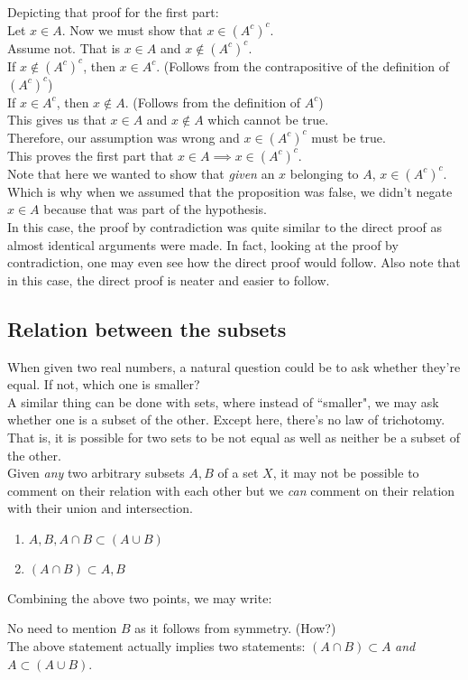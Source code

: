 Depicting that proof for the first part:\\
{\color{claimcolor}%
Let $x \in A$. Now we must show that $x \in (A^c)^c$.\\
Assume not. That is $x \in A$ and $x \not \in (A^c)^c$.\\
If $x \not \in (A^c)^c$, then $x \in A^c$.  \hfill (Follows from the contrapositive of the definition of $(A^c)^c$)\\
If $x \in A^c$, then $x \not \in A.$  \hfill (Follows from the definition of $A^c$)\\
This gives us that $x\in A$ and $x\not\in A$ which cannot be true.\\ Therefore, our assumption was wrong and $x \in (A^c)^c$ must be true.\\
This proves the first part that $x \in A \implies x \in (A^c)^c.$
}\\
Note that here we wanted to show that \textit{given} an $x$ belonging to $A$, $x \in (A^c)^c$. Which is why when we assumed that the proposition was false, we didn't negate $x \in A$ because that was part of the hypothesis.\\
In this case, the proof by contradiction was quite similar to the direct proof as almost identical arguments were made. In fact, looking at the proof by contradiction, one may even see how the direct proof would follow. Also note that in this case, the direct proof is neater and easier to follow.
%
\subsection{Relation between the subsets}\label{ssec:relsubset}
When given two real numbers, a natural question could be to ask whether they're equal. If not, which one is smaller?\\
A similar thing can be done with sets, where instead of ``smaller", we may ask whether one is a subset of the other. Except here, there's no law of trichotomy. That is, it is possible for two sets to be not equal as well as neither be a subset of the other.\\
Given \textit{any} two arbitrary subsets $A, B$ of a set $X$, it may not be possible to comment on their relation with each other but we \textit{can} comment on their relation with their union and intersection.
\begin{enumerate}
    \itemsep0em
    \item $A, B, A \cap B \subset (A \cup B)$
    \item $(A\cap B) \subset A, B$
\end{enumerate}
Combining the above two points, we may write:
\begin{center}
\end{center}
No need to mention $B$ as it follows from symmetry. (How?)\\
The above statement actually implies two statements: $(A\cap B)\subset A$ \textit{and} $A \subset (A\cup B)$.

